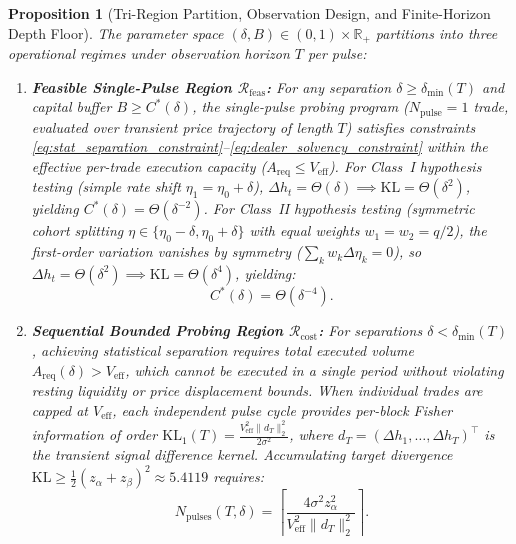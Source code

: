 \documentclass[12pt]{article}
\newtheorem{proposition}[theorem]{Proposition}
\theoremstyle{definition}
\theoremstyle{remark}
\newcommand{\R}{\mathbb{R}}
\begin{document}
\begin{proposition}[Tri-Region Partition, Observation Design, and Finite-Horizon Depth Floor]
\label{prop:tri_region_partition}
The parameter space $(\delta, B) \in (0, 1) \times \R_+$ partitions into three operational regimes under observation horizon $T$ per pulse:
\begin{enumerate}[label=(\roman*)]
\item \textbf{Feasible Single-Pulse Region $\mathcal{R}_{\mathrm{feas}}$:} For any separation $\delta \ge \delta_{\min}(T)$ and capital buffer $B \ge C^*(\delta)$, the single-pulse probing program ($N_{\mathrm{pulse}} = 1$ trade, evaluated over transient price trajectory of length $T$) satisfies constraints \eqref{eq:stat_separation_constraint}--\eqref{eq:dealer_solvency_constraint} within the effective per-trade execution capacity ($A_{\mathrm{req}} \le V_{\mathrm{eff}}$). For Class~I hypothesis testing (simple rate shift $\eta_1 = \eta_0 + \delta$), $\Delta h_t = \Theta(\delta) \implies \mathrm{KL} = \Theta(\delta^2)$, yielding $C^*(\delta) = \Theta(\delta^{-2})$. For Class~II hypothesis testing (symmetric cohort splitting $\eta \in \{\eta_0 - \delta, \eta_0 + \delta\}$ with equal weights $w_1 = w_2 = q/2$), the first-order variation vanishes by symmetry ($\sum_k w_k \Delta \eta_k = 0$), so $\Delta h_t = \Theta(\delta^2) \implies \mathrm{KL} = \Theta(\delta^4)$, yielding:
\begin{equation}
C^*(\delta) = \Theta(\delta^{-4}).
\end{equation}
\item \textbf{Sequential Bounded Probing Region $\mathcal{R}_{\mathrm{cost}}$:} For separations $\delta < \delta_{\min}(T)$, achieving statistical separation requires total executed volume $A_{\mathrm{req}}(\delta) > V_{\mathrm{eff}}$, which cannot be executed in a single period without violating resting liquidity or price displacement bounds. When individual trades are capped at $V_{\mathrm{eff}}$, each independent pulse cycle provides per-block Fisher information of order $\mathrm{KL}_1(T) = \frac{V_{\mathrm{eff}}^2 \|d_T\|_2^2}{2\sigma^2}$, where $d_T = (\Delta h_1, \dots, \Delta h_T)^\top$ is the transient signal difference kernel. Accumulating target divergence $\mathrm{KL} \ge \frac{1}{2}(z_\alpha + z_\beta)^2 \approx 5.4119$ requires:
\begin{equation}
N_{\mathrm{pulses}}(T, \delta) = \left\lceil \frac{4\sigma^2 z_\alpha^2}{V_{\mathrm{eff}}^2 \|d_T\|_2^2} \right\rceil.
\end{equation}

\end{enumerate}
\end{proposition}
\end{document}
